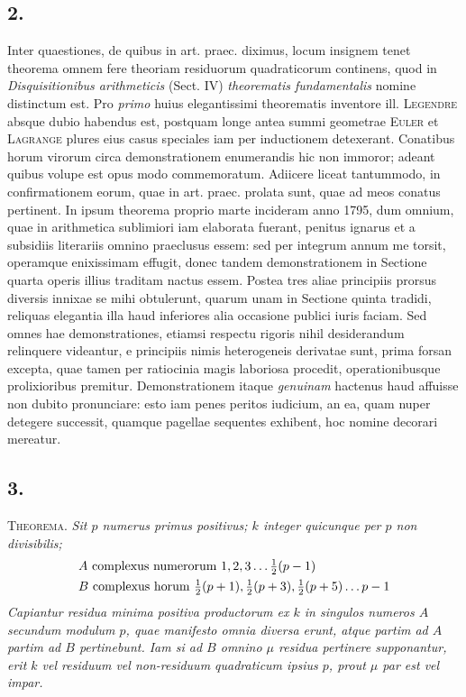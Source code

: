 \documentclass[twoside,12pt]{memoir}
\let\oldfrac\frac
\def\frac#1#2{\mathchoice{\tfrac{#1}{#2}}{\oldfrac{#1}{#2}}{\genfrac{}{}{}{2}{#1}{#2\mathstrut}}{\genfrac{}{}{}{3}{#1}{#2\mathstrut}}}
\begin{document}
\subsection*{2.}
 
Inter quaestiones, de quibus in art. praec. diximus, locum insignem tenet theorema omnem fere theoriam residuorum quadraticorum continens, quod in \textit{Disquisitionibus arithmeticis} (Sect. IV) \textit{theorematis fundamentalis} nomine distinctum \pagebreak%
est. Pro \textit{primo} huius elegantissimi theorematis inventore ill. \textsc{Legendre} absque dubio habendus est, postquam longe antea summi geometrae \textsc{Euler} et \textsc{Lagrange} plures eius casus speciales iam per inductionem detexerant. Conatibus horum virorum circa demonstrationem enumerandis hic non immoror; adeant quibus volupe est opus modo commemoratum. Adiicere liceat tantummodo, in confirmationem eorum, quae in art. praec. prolata sunt, quae ad meos conatus pertinent. In ipsum theorema proprio marte incideram anno 1795, dum omnium, quae in arithmetica sublimiori iam elaborata fuerant, penitus ignarus et a subsidiis literariis omnino praeclusus essem: sed per integrum annum me torsit, operamque enixissimam effugit, donec tandem demonstrationem in Sectione quarta operis illius traditam nactus essem. Postea tres aliae principiis prorsus diversis innixae se mihi obtulerunt, quarum unam in Sectione quinta tradidi, reliquas elegantia illa haud inferiores alia occasione publici iuris faciam. Sed omnes hae demonstrationes, etiamsi respectu rigoris nihil desiderandum relinquere videantur, e principiis nimis heterogeneis derivatae sunt, prima forsan excepta, quae tamen per ratiocinia magis laboriosa procedit, operationibusque prolixioribus premitur. Demonstrationem itaque \textit{genuinam} hactenus haud affuisse non dubito pronunciare: esto iam penes peritos iudicium, an ea, quam nuper detegere successit, quamque pagellae sequentes exhibent, hoc nomine decorari mereatur.

\subsection*{3.}
 
\textsc{Theorema.} \textit{Sit \(p\) numerus primus positivus; \(k\) integer quicunque per \(p\) non divisibilis;
\[\begin{aligned}
&A \text{ complexus numerorum }1,2,3 \ldots \frac{1}{2}(p-1)\\
&B \text{ complexus horum } \frac{1}{2}(p+1), \frac{1}{2}(p+3), \frac{1}{2}(p+5) \ldots p-1
\end{aligned}\]
Capiantur residua minima positiva productorum ex \(k\) in singulos numeros \(A\) secundum modulum \(p\), quae manifesto omnia diversa erunt, atque partim ad \(A\) partim ad \(B\) pertinebunt. Iam si ad \(B\) omnino \(\mu\) residua pertinere supponantur, erit \(k\) vel residuum vel non-residuum quadraticum ipsius \(p\), prout \(\mu\) par est vel impar.}
 
\end{document}
